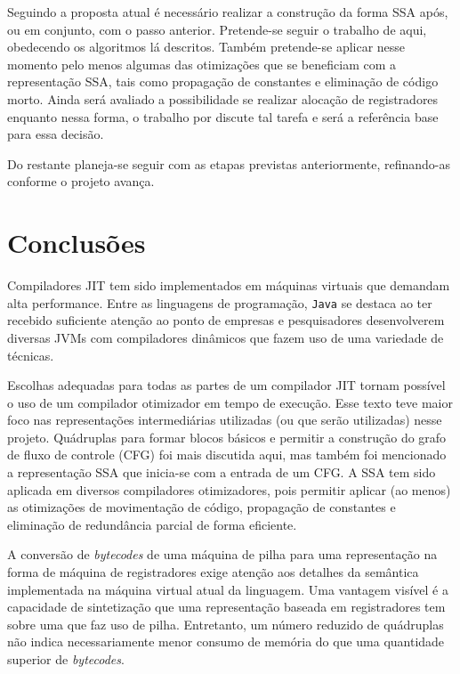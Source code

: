 Seguindo a proposta atual é necessário realizar a construção da forma
SSA após, ou em conjunto, com o passo anterior. Pretende-se seguir o
trabalho de  aqui, obedecendo os algoritmos lá
descritos. Também pretende-se aplicar nesse momento pelo menos algumas
das otimizações que se beneficiam com a representação SSA, tais como
propagação de constantes e eliminação de código morto. Ainda será
avaliado a possibilidade se realizar alocação de registradores
enquanto nessa forma, o trabalho por  discute
tal tarefa e será a referência base para essa decisão.

Do restante planeja-se seguir com as etapas previstas anteriormente,
refinando-as conforme o projeto avança.


\section{Conclusões}

Compiladores JIT tem sido implementados em máquinas virtuais que demandam
alta performance. Entre as linguagens de programação, \texttt{Java} se
destaca ao ter recebido suficiente atenção ao ponto de empresas e
pesquisadores desenvolverem diversas JVMs com compiladores
dinâmicos que fazem uso de uma variedade de técnicas.

Escolhas adequadas para todas as partes de um compilador JIT tornam
possível o uso de um compilador otimizador em tempo de execução. Esse
texto teve maior foco nas representações intermediárias utilizadas (ou
que serão utilizadas) nesse projeto. Quádruplas para formar blocos
básicos e permitir a construção do grafo de fluxo de controle (CFG)
foi mais discutida aqui, mas também foi mencionado a representação SSA
que inicia-se com a entrada de um CFG. A SSA tem sido aplicada em
diversos compiladores otimizadores, pois permitir aplicar (ao menos)
as otimizações de movimentação de código, propagação de constantes e
eliminação de redundância parcial de forma eficiente.

A conversão de \textit{bytecodes} de uma máquina de pilha para uma
representação na forma de máquina de registradores exige atenção aos
detalhes da semântica implementada na máquina virtual atual da
linguagem. Uma vantagem visível é a capacidade de sintetização que
uma representação baseada em registradores tem sobre uma que faz uso
de pilha. Entretanto, um número reduzido de quádruplas não indica
necessariamente menor consumo de memória do que uma quantidade
superior de \textit{bytecodes}.



\let\stdsection\section
\def\section*#1{\stdsection{#1}}

\let\section\stdsection
